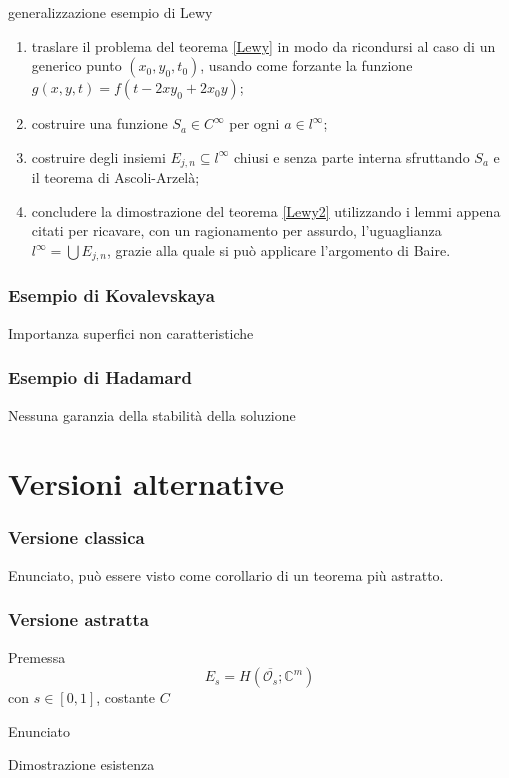 \documentclass{beamer}
\begin{document}
\begin{frame}
generalizzazione esempio di Lewy
\begin{enumerate}
\item
traslare il problema del teorema \ref{Lewy} in modo da ricondursi al caso di un generico punto $(x_0,y_0,t_0)$, usando come forzante la funzione $g(x,y,t)=f(t-2xy_0+2x_0y)$;
\item
costruire una funzione $S_a \in C^\infty$ per ogni $a \in l^\infty$;
\item
costruire degli insiemi $E_{j,n} \subseteq l^\infty$ chiusi e senza parte interna sfruttando $S_a$ e il teorema di Ascoli-Arzelà;
\item
concludere la dimostrazione del teorema \ref{Lewy2} utilizzando i lemmi appena citati per ricavare, con un ragionamento per assurdo, l'uguaglianza $l^\infty = \bigcup E_{j,n}$, grazie alla quale si può applicare l'argomento di Baire.
\end{enumerate}
\end{frame}

\begin{frame}
\frametitle{Esempio di Kovalevskaya}
Importanza superfici non caratteristiche
\end{frame}

\begin{frame}
\frametitle{Esempio di Hadamard}
Nessuna garanzia della stabilità della soluzione
\end{frame}



\section{Versioni alternative}

\begin{frame}
\frametitle{Versione classica}
Enunciato, può essere visto come corollario di un teorema più astratto.
\end{frame}

\begin{frame}
\frametitle{Versione astratta}
Premessa $$E_s = H(\overline{\mathcal{O}_s}; \mathbb{C}^m)$$ con $s \in [0,1]$, costante $C$
\end{frame}

\begin{frame}
Enunciato
\end{frame}

\begin{frame}
Dimostrazione esistenza
\end{frame}
\end{document}
